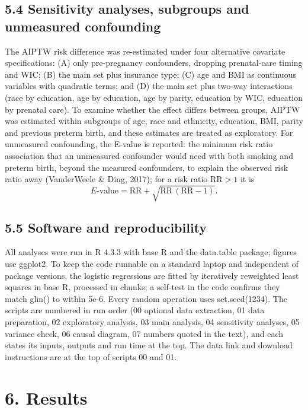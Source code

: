 \documentclass[11pt,letterpaper]{article}
\begin{document}
\subsection*{5.4 Sensitivity analyses, subgroups and unmeasured confounding}

The AIPTW risk difference was re-estimated under four alternative covariate specifications: (A) only pre-pregnancy confounders, dropping prenatal-care timing and WIC; (B) the main set plus insurance type; (C) age and BMI as continuous variables with quadratic terms; and (D) the main set plus two-way interactions (race by education, age by education, age by parity, education by WIC, education by prenatal care). To examine whether the effect differs between groups, AIPTW was estimated within subgroups of age, race and ethnicity, education, BMI, parity and previous preterm birth, and these estimates are treated as exploratory. For unmeasured confounding, the E-value is reported: the minimum risk ratio association that an unmeasured confounder would need with both smoking and preterm birth, beyond the measured confounders, to explain the observed risk ratio away (VanderWeele \& Ding, 2017); for a risk ratio $\mathrm{RR} > 1$ it is
\begin{equation}
E\text{-value} = \mathrm{RR} + \sqrt{\mathrm{RR}\,(\mathrm{RR} - 1)}.
\end{equation}

\subsection*{5.5 Software and reproducibility}

All analyses were run in R 4.3.3 with base R and the data.table package; figures use ggplot2. To keep the code runnable on a standard laptop and independent of package versions, the logistic regressions are fitted by iteratively reweighted least squares in base R, processed in chunks; a self-test in the code confirms they match glm() to within 5e-6. Every random operation uses set.seed(1234). The scripts are numbered in run order (00 optional data extraction, 01 data preparation, 02 exploratory analysis, 03 main analysis, 04 sensitivity analyses, 05 variance check, 06 causal diagram, 07 numbers quoted in the text), and each states its inputs, outputs and run time at the top. The data link and download instructions are at the top of scripts 00 and 01.

\section*{6. Results}
\end{document}
